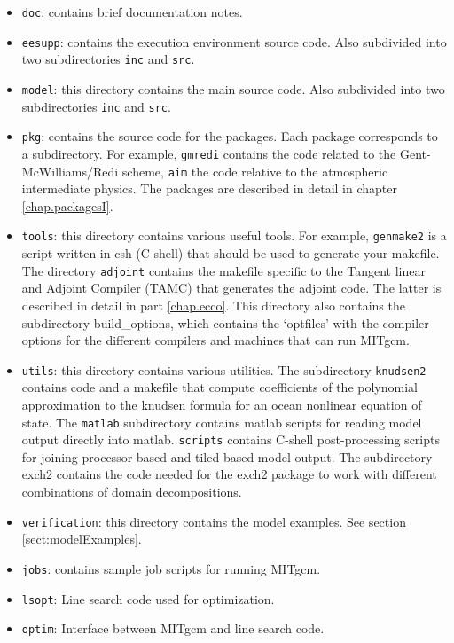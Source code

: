 \begin{itemize}

\item \texttt{doc}: contains brief documentation notes.
  
\item \texttt{eesupp}: contains the execution environment source code.
  Also subdivided into two subdirectories \texttt{inc} and
  \texttt{src}.
  
\item \texttt{model}: this directory contains the main source code.
  Also subdivided into two subdirectories \texttt{inc} and
  \texttt{src}.
  
\item \texttt{pkg}: contains the source code for the packages. Each
  package corresponds to a subdirectory. For example, \texttt{gmredi}
  contains the code related to the Gent-McWilliams/Redi scheme,
  \texttt{aim} the code relative to the atmospheric intermediate
  physics. The packages are described in detail in chapter \ref{chap.packagesI}.
  
\item \texttt{tools}: this directory contains various useful tools.
  For example, \texttt{genmake2} is a script written in csh (C-shell)
  that should be used to generate your makefile. The directory
  \texttt{adjoint} contains the makefile specific to the Tangent
  linear and Adjoint Compiler (TAMC) that generates the adjoint code.
  The latter is described in detail in part \ref{chap.ecco}.
  This directory also contains the subdirectory build\_options, which
  contains the `optfiles' with the compiler options for the different
  compilers and machines that can run MITgcm.
  
\item \texttt{utils}: this directory contains various utilities. The
  subdirectory \texttt{knudsen2} contains code and a makefile that
  compute coefficients of the polynomial approximation to the knudsen
  formula for an ocean nonlinear equation of state. The
  \texttt{matlab} subdirectory contains matlab scripts for reading
  model output directly into matlab. \texttt{scripts} contains C-shell
  post-processing scripts for joining processor-based and tiled-based
  model output. The subdirectory exch2 contains the code needed for
  the exch2 package to work with different combinations of domain
  decompositions.
  
\item \texttt{verification}: this directory contains the model
  examples. See section \ref{sect:modelExamples}.

\item \texttt{jobs}: contains sample job scripts for running MITgcm.
  
\item \texttt{lsopt}: Line search code used for optimization.
  
\item \texttt{optim}: Interface between MITgcm and line search code.
  
\end{itemize}

